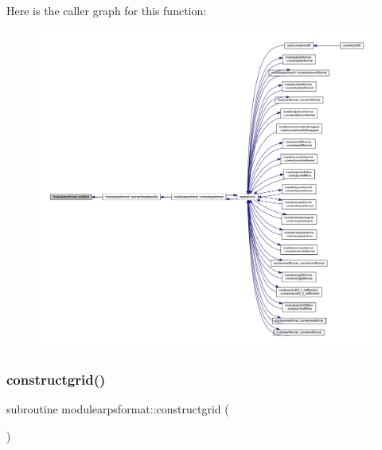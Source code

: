 Here is the caller graph for this function\+:\nopagebreak
\begin{figure}[H]
\begin{center}
\leavevmode
\includegraphics[width=350pt]{namespacemodulearpsformat_a32649b9f39dfaa2b5396d488243a3905_icgraph}
\end{center}
\end{figure}
\mbox{\label{namespacemodulearpsformat_a420eb740016c6ba55f897dbff1ef74e5}} 
\subsubsection{\texorpdfstring{constructgrid()}{constructgrid()}}
{\footnotesize\ttfamily subroutine modulearpsformat\+::constructgrid (\begin{DoxyParamCaption}{ }\end{DoxyParamCaption})\hspace{0.3cm}{\ttfamily [private]}}

